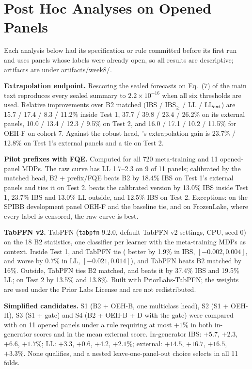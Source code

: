 \section{Post Hoc Analyses on Opened Panels}
\label{supp:posthoc}
Each analysis below had its specification or rule committed before its first run and uses panels whose labels were already open, so all results are descriptive; artifacts are under \url{artifacts/week8/}.

\textbf{Extrapolation endpoint.} Rescoring the sealed forecasts on Eq.~(7) of the main text reproduces every sealed summary to $2.2\times10^{-16}$ when all six thresholds are used. Relative improvements over B2 matched (IBS / $\mathrm{IBS}_\ge$ / LL / $\mathrm{LL}_{\rm ext}$) are 15.7 / 17.4 / 8.3 / 11.2\% inside Test 1, 37.7 / 39.8 / 23.4 / 26.2\% on its external panels, 10.0 / 13.4 / 12.3 / 9.5\% on Test 2, and 16.0 / 17.1 / 10.2 / 11.5\% for OEH-F on cohort 7. Against the robust head, \OEH{}'s extrapolation gain is 23.7\% / 12.8\% on Test 1's external panels and a tie on Test 2.

\textbf{Pilot prefixes with FQE.} Computed for all 720 meta-training and 11 opened-panel MDPs. The raw curve has LL 1.7--2.3 on 9 of 11 panels; calibrated by the matched head, B2 + prefix/FQE beats B2 by 18.4\% IBS on Test 1's external panels and ties it on Test 2. \OEH{} beats the calibrated version by 13.0\% IBS inside Test 1, 23.7\% IBS and 13.0\% LL outside, and 12.5\% IBS on Test 2. Exceptions: on the SPIBB development panel OEH-F and the baseline tie, and on FrozenLake, where every label is censored, the raw curve is best.

\textbf{TabPFN v2.} TabPFN (\texttt{tabpfn} 9.2.0, default TabPFN v2 settings, CPU, seed 0) on the 18 B2 statistics, one classifier per learner with the meta-training MDPs as context. Inside Test 1, \OEH{} and TabPFN tie (\OEH{} better by 1.9\% in IBS, $[-0.002,0.004]$, and worse by 0.7\% in LL, $[-0.021,0.014]$), and TabPFN beats B2 matched by 16\%. Outside, TabPFN ties B2 matched, and \OEH{} beats it by 37.4\% IBS and 19.5\% LL; on Test 2 by 13.5\% and 13.8\%. Built with PriorLabs-TabPFN; the weights are used under the Prior Labs License and are not redistributed.

\textbf{Simplified candidates.} S1 (B2 + OEH-B, one multiclass head), S2 (S1 + OEH-H), S3 (S1 + gate) and S4 (B2 + OEH-B + D with the gate) were compared with \OEH{} on 11 opened panels under a rule requiring at most $+1\%$ in both in-generator scores and in the mean external score. In-generator IBS: $+5.7$, $+2.3$, $+6.6$, $+1.7\%$; LL: $+3.3$, $+0.6$, $+4.2$, $+2.1\%$; external: $+14.5$, $+16.7$, $+16.5$, $+3.3\%$. None qualifies, and a nested leave-one-panel-out choice selects \OEH{} in all 11 folds.

